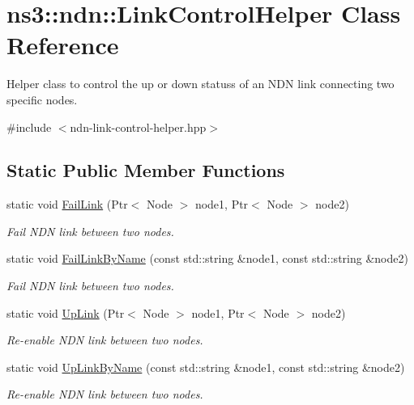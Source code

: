\hypertarget{classns3_1_1ndn_1_1LinkControlHelper}{}\section{ns3\+:\+:ndn\+:\+:Link\+Control\+Helper Class Reference}
\label{classns3_1_1ndn_1_1LinkControlHelper}


Helper class to control the up or down statuss of an N\+DN link connecting two specific nodes.  




{\ttfamily \#include $<$ndn-\/link-\/control-\/helper.\+hpp$>$}

\subsection*{Static Public Member Functions}
\begin{DoxyCompactItemize}
\item 
static void \hyperlink{classns3_1_1ndn_1_1LinkControlHelper_a82e1e55f084c6ddf9cb0208a2dc259e3}{Fail\+Link} (Ptr$<$ Node $>$ node1, Ptr$<$ Node $>$ node2)
\begin{DoxyCompactList}\small\item\em Fail N\+DN link between two nodes. \end{DoxyCompactList}\item 
static void \hyperlink{classns3_1_1ndn_1_1LinkControlHelper_ad225d4e3eef5c56947282df2e32a79d9}{Fail\+Link\+By\+Name} (const std\+::string \&node1, const std\+::string \&node2)
\begin{DoxyCompactList}\small\item\em Fail N\+DN link between two nodes. \end{DoxyCompactList}\item 
static void \hyperlink{classns3_1_1ndn_1_1LinkControlHelper_ab1bfbd3ea143e42e56f25a0b178cdd9c}{Up\+Link} (Ptr$<$ Node $>$ node1, Ptr$<$ Node $>$ node2)
\begin{DoxyCompactList}\small\item\em Re-\/enable N\+DN link between two nodes. \end{DoxyCompactList}\item 
static void \hyperlink{classns3_1_1ndn_1_1LinkControlHelper_a054aea060cbdfdfbdfbf77ae7fa484bb}{Up\+Link\+By\+Name} (const std\+::string \&node1, const std\+::string \&node2)
\begin{DoxyCompactList}\small\item\em Re-\/enable N\+DN link between two nodes. \end{DoxyCompactList}\end{DoxyCompactItemize}


